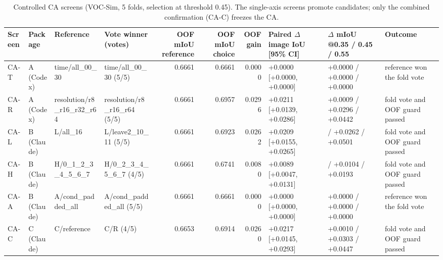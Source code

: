 \begin{table}[H]\centering\scriptsize\setlength{\tabcolsep}{3pt}
\begin{tabular}{>{\raggedright\arraybackslash}p{1.40cm}>{\raggedright\arraybackslash}p{1.40cm}>{\raggedright\arraybackslash}p{1.40cm}>{\raggedright\arraybackslash}p{1.40cm}rrr>{\raggedright\arraybackslash}p{1.40cm}>{\raggedright\arraybackslash}p{1.40cm}>{\raggedright\arraybackslash}p{1.40cm}}
\toprule
Screen & Package & Reference & Vote winner (votes) & OOF mIoU reference & OOF mIoU choice & OOF gain & Paired $\Delta$ image IoU [95\% CI] & $\Delta$ mIoU @0.35 /\allowbreak{} 0.45 /\allowbreak{} 0.55 & Outcome \\
\midrule
CA-T & A (Codex) & time/\allowbreak{}all\_\allowbreak{}00\_\allowbreak{}30 & time/\allowbreak{}all\_\allowbreak{}00\_\allowbreak{}30 (5/\allowbreak{}5) & 0.6661 & 0.6661 & 0.0000 & +0.0000 [+0.0000, +0.0000] & +0.0000 /\allowbreak{} +0.0000 /\allowbreak{} +0.0000 & reference won the fold vote \\
CA-R & A (Codex) & resolution/\allowbreak{}r8\_\allowbreak{}r16\_\allowbreak{}r32\_\allowbreak{}r64 & resolution/\allowbreak{}r8\_\allowbreak{}r16\_\allowbreak{}r64 (5/\allowbreak{}5) & 0.6661 & 0.6957 & 0.0296 & +0.0211 [+0.0139, +0.0286] & +0.0009 /\allowbreak{} +0.0296 /\allowbreak{} +0.0442 & fold vote and OOF guard passed \\
CA-L & B (Claude) & L/\allowbreak{}all\_\allowbreak{}16 & L/\allowbreak{}leave2\_\allowbreak{}10\_\allowbreak{}11 (5/\allowbreak{}5) & 0.6661 & 0.6923 & 0.0262 & +0.0209 [+0.0155, +0.0265] & -0.0021 /\allowbreak{} +0.0262 /\allowbreak{} +0.0501 & fold vote and OOF guard passed \\
CA-H & B (Claude) & H/\allowbreak{}0\_\allowbreak{}1\_\allowbreak{}2\_\allowbreak{}3\_\allowbreak{}4\_\allowbreak{}5\_\allowbreak{}6\_\allowbreak{}7 & H/\allowbreak{}0\_\allowbreak{}2\_\allowbreak{}3\_\allowbreak{}4\_\allowbreak{}5\_\allowbreak{}6\_\allowbreak{}7 (4/\allowbreak{}5) & 0.6661 & 0.6741 & 0.0080 & +0.0089 [+0.0047, +0.0131] & -0.0002 /\allowbreak{} +0.0104 /\allowbreak{} +0.0193 & fold vote and OOF guard passed \\
CA-A & B (Claude) & A/\allowbreak{}cond\_\allowbreak{}padded\_\allowbreak{}all & A/\allowbreak{}cond\_\allowbreak{}padded\_\allowbreak{}all (5/\allowbreak{}5) & 0.6661 & 0.6661 & 0.0000 & +0.0000 [+0.0000, +0.0000] & +0.0000 /\allowbreak{} +0.0000 /\allowbreak{} +0.0000 & reference won the fold vote \\
CA-C & C (Claude) & C/\allowbreak{}reference & C/\allowbreak{}R (4/\allowbreak{}5) & 0.6653 & 0.6914 & 0.0260 & +0.0217 [+0.0145, +0.0293] & +0.0010 /\allowbreak{} +0.0303 /\allowbreak{} +0.0447 & fold vote and OOF guard passed \\
\bottomrule
\end{tabular}
\caption{Controlled CA screens (VOC-Sim, 5 folds, selection at threshold 0.45). The single-axis screens promote candidates; only the combined confirmation (CA-C) freezes the CA.}\label{tab:a_cv_summary}
\end{table}

